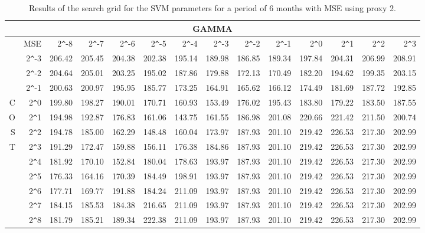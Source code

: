 \begin{table}[h!]
\centering
\begin{adjustbox}{width=\textwidth}
\begin{tabular}{|r|r|rrrrrrrrrrrr|}
\hline
\multicolumn{14}{|c|}{GAMMA} \tabularnewline
 \hline
 &MSE& 2\verb|^|-8 & 2\verb|^|-7 & 2\verb|^|-6 & 2\verb|^|-5 & 2\verb|^|-4 & 2\verb|^|-3 & 2\verb|^|-2 & 2\verb|^|-1 & 2\verb|^|0 & 2\verb|^|1 & 2\verb|^|2 & 2\verb|^|3 \\ 
  \hline
  &2\verb|^|-3 & 206.42 & 205.45 & 204.38 & 202.38 & 195.14 & 189.98 & 186.85 & 189.34 & 197.84 & 204.31 & 206.99 & 208.91 \\ 
  &2\verb|^|-2 & 204.64 & 205.01 & 203.25 & 195.02 & 187.86 & 179.88 & 172.13 & 170.49 & 182.20 & 194.62 & 199.35 & 203.15 \\ 
  &2\verb|^|-1 & 200.63 & 200.97 & 195.95 & 185.77 & 173.25 & 164.91 & 165.62 & 166.12 & 174.49 & 181.69 & 187.72 & 192.85 \\ 
  C&2\verb|^|0 & 199.80 & 198.27 & 190.01 & 170.71 & 160.93 & 153.49 & 176.02 & 195.43 & 183.80 & 179.22 & 183.50 & 187.55 \\ 
  O&2\verb|^|1 & 194.98 & 192.87 & 176.83 & 161.06 & 143.75 & 161.55 & 186.98 & 201.08 & 220.66 & 221.42 & 211.50 & 200.74 \\ 
  S&2\verb|^|2 & 194.78 & 185.00 & 162.29 & 148.48 & 160.04 & 173.97 & 187.93 & 201.10 & 219.42 & 226.53 & 217.30 & 202.99 \\ 
  T&2\verb|^|3 & 191.29 & 172.47 & 159.88 & 156.11 & 176.38 & 184.86 & 187.93 & 201.10 & 219.42 & 226.53 & 217.30 & 202.99 \\ 
  &2\verb|^|4 & 181.92 & 170.10 & 152.84 & 180.04 & 178.63 & 193.97 & 187.93 & 201.10 & 219.42 & 226.53 & 217.30 & 202.99 \\ 
  &2\verb|^|5 & 176.33 & 164.16 & 170.39 & 184.49 & 198.91 & 193.97 & 187.93 & 201.10 & 219.42 & 226.53 & 217.30 & 202.99 \\ 
  &2\verb|^|6 & 177.71 & 169.77 & 191.88 & 184.24 & 211.09 & 193.97 & 187.93 & 201.10 & 219.42 & 226.53 & 217.30 & 202.99 \\ 
  &2\verb|^|7 & 184.15 & 185.53 & 184.38 & 216.65 & 211.09 & 193.97 & 187.93 & 201.10 & 219.42 & 226.53 & 217.30 & 202.99 \\ 
  &2\verb|^|8 & 181.79 & 185.21 & 189.34 & 222.38 & 211.09 & 193.97 & 187.93 & 201.10 & 219.42 & 226.53 & 217.30 & 202.99 \\ 
   \hline
\end{tabular}
\end{adjustbox}
\caption{Results of the search grid for the SVM parameters for a period of 6 months with MSE using proxy 2.}
\end{table}
